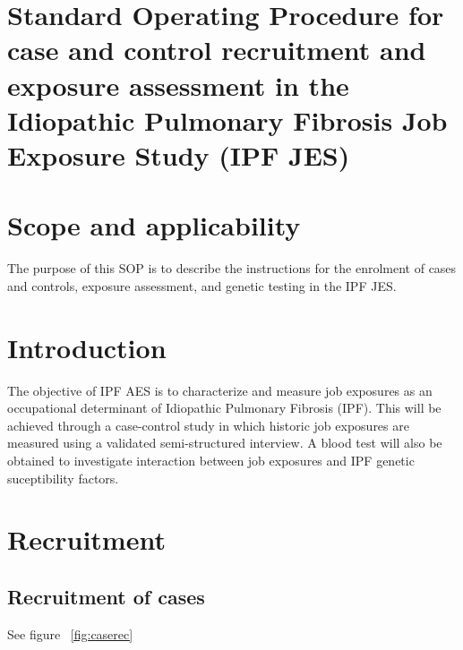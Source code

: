 \documentclass[a4paper,10pt]{article}
\begin{document}
 
 
 \pagestyle{fancy}
 
 


\section*{Standard Operating Procedure for case and control recruitment and exposure assessment in the Idiopathic Pulmonary Fibrosis Job Exposure Study (IPF JES)}

\tableofcontents

\section{Scope and applicability}

The purpose of this SOP is to describe the instructions for the enrolment of cases and controls, exposure assessment, and genetic testing in the IPF JES.

\section{Introduction}

The objective of IPF AES is to characterize and measure job exposures as an occupational determinant of Idiopathic Pulmonary Fibrosis (IPF). This will be achieved through a case-control study in which historic job exposures are measured using a validated semi-structured interview. A blood test will also be obtained to investigate interaction between job exposures and IPF genetic suceptibility factors.   

\section{Recruitment}

\subsection{Recruitment of cases}

See figure ~\ref{fig:caserec}
\end{document}
